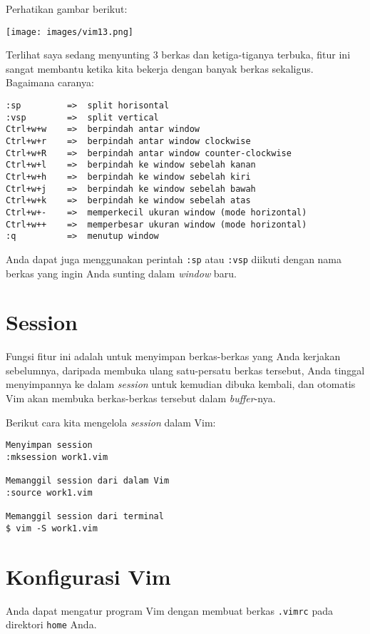 \documentclass{article}
\begin{document}
Perhatikan gambar berikut:

\vspace{12pt}

\texttt{[image: images/vim13.png]}

\vspace{12pt}

Terlihat saya sedang menyunting 3 berkas dan ketiga-tiganya
terbuka, fitur ini sangat membantu ketika kita bekerja
dengan banyak berkas sekaligus. Bagaimana caranya:

\begin{verbatim}
:sp         =>  split horisontal
:vsp        =>  split vertical
Ctrl+w+w    =>  berpindah antar window
Ctrl+w+r    =>  berpindah antar window clockwise
Ctrl+w+R    =>  berpindah antar window counter-clockwise
Ctrl+w+l    =>  berpindah ke window sebelah kanan
Ctrl+w+h    =>  berpindah ke window sebelah kiri 
Ctrl+w+j    =>  berpindah ke window sebelah bawah 
Ctrl+w+k    =>  berpindah ke window sebelah atas 
Ctrl+w+-    =>  memperkecil ukuran window (mode horizontal)
Ctrl+w++    =>  memperbesar ukuran window (mode horizontal)
:q          =>  menutup window
\end{verbatim}

Anda dapat juga menggunakan perintah \verb=:sp= atau
\verb=:vsp= diikuti dengan nama berkas yang ingin Anda
sunting dalam \emph{window} baru.

\section{Session}
Fungsi fitur ini adalah untuk menyimpan berkas-berkas yang
Anda kerjakan sebelumnya, daripada membuka ulang
satu-persatu berkas tersebut, Anda tinggal menyimpannya ke
dalam \emph{session} untuk kemudian dibuka kembali, dan
otomatis Vim akan membuka berkas-berkas tersebut dalam
\emph{buffer}-nya. 

Berikut cara kita mengelola \emph{session} dalam Vim:

\begin{verbatim}
Menyimpan session
:mksession work1.vim

Memanggil session dari dalam Vim
:source work1.vim

Memanggil session dari terminal
$ vim -S work1.vim
\end{verbatim}


\section{Konfigurasi Vim}
Anda dapat mengatur program Vim dengan membuat berkas
\verb=.vimrc= pada direktori \verb=home= Anda.
\end{document}
